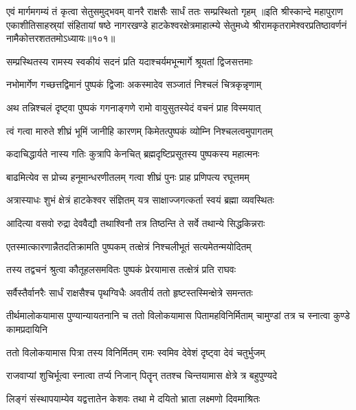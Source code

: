 \twolineshloka
{एवं मार्गमगम्यं तं कृत्वा सेतुसमुद्भवम्}
{वानरै राक्षसैः सार्धं ततः सम्प्रस्थितो गृहम्}%
॥इति श्रीस्कान्दे महापुराण एकाशीतिसाहस्र्यां संहितायां षष्ठे नागरखण्डे हाटकेश्वरक्षेत्रमाहात्म्ये सेतुमध्ये श्रीरामकृतरामेश्वरप्रतिष्ठावर्णनं नामैकोत्तरशततमोऽध्यायः॥१०१॥


\twolineshloka
{सम्प्रस्थितस्य रामस्य स्वकीयं सदनं प्रति}
{यदाश्चर्यमभून्मार्गे श्रूयतां द्विजसत्तमाः}%

\twolineshloka
{नभोमार्गेण गच्छत्तद्विमानं पुष्पकं द्विजाः}
{अकस्मादेव सञ्जातं निश्चलं चित्रकृन्नृणाम्}%

\twolineshloka
{अथ तन्निश्चलं दृष्ट्वा पुष्पकं गगनाङ्गणे}
{रामो वायुसुतस्येदं वचनं प्राह विस्मयात्}%

\twolineshloka
{त्वं गत्वा मारुते शीघ्रं भूमिं जानीहि कारणम्}
{किमेतत्पुष्पकं व्योम्नि निश्चलत्वमुपागतम्}%

\twolineshloka
{कदाचिद्धार्यते नास्य गतिः कुत्रापि केनचित्}
{ब्रह्मदृष्टिप्रसूतस्य पुष्पकस्य महात्मनः}%

\twolineshloka
{बाढमित्येव स प्रोच्य हनूमान्धरणीतलम्}
{गत्वा शीघ्रं पुनः प्राह प्रणिपत्य रघूत्तमम्}%

\twolineshloka
{अत्रास्याधः शुभं क्षेत्रं हाटकेश्वर संज्ञितम्}
{यत्र साक्षाज्जगत्कर्ता स्वयं ब्रह्मा व्यवस्थितः}%

\twolineshloka
{आदित्या वसवो रुद्रा देववैद्यौ तथाश्विनौ}
{तत्र तिष्ठन्ति ते सर्वे तथान्ये सिद्धकिन्नराः}%

\twolineshloka
{एतस्मात्कारणान्नैतदतिक्रामति पुष्पकम्}
{तत्क्षेत्रं निश्चलीभूतं सत्यमेतन्मयोदितम्}%


\twolineshloka
{तस्य तद्वचनं श्रुत्वा कौतूहलसमवितः} 
{पुष्पकं प्रेरयामास तत्क्षेत्रं प्रति राघवः} 

\twolineshloka
{सर्वैस्तैर्वानरैः सार्धं राक्षसैश्च पृथग्विधैः}
{अवतीर्य ततो हृष्टस्तस्मिन्क्षेत्रे समन्ततः}%

\threelineshloka
{तीर्थमालोकयामास पुण्यान्यायतनानि च}
{ततो विलोकयामास पितामहविनिर्मिताम्}
{चामुण्डां तत्र च स्नात्वा कुण्डे कामप्रदायिनि}%

\twolineshloka
{ततो विलोकयामास पित्रा तस्य विनिर्मितम्}
{रामः स्वमिव देवेशं दृष्ट्वा देवं चतुर्भुजम्}%

\twolineshloka
{राजवाप्यां शुचिर्भूत्वा स्नात्वा तर्प्य निजान् पितॄन्}
{ततश्च चिन्तयामास क्षेत्रे त्र बहुपुण्यदे}%

\twolineshloka
{लिङ्गं संस्थापयाम्येव यद्वत्तातेन केशवः}
{तथा मे दयितो भ्राता लक्ष्मणो दिवमाश्रितः}%


